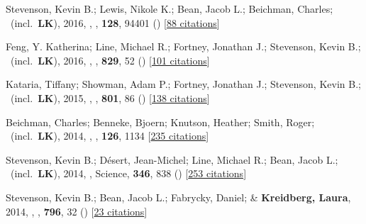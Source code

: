 \item[{\color{numcolor}\scriptsize9}] Stevenson, Kevin B.; Lewis, Nikole K.; Bean, Jacob L.; Beichman, Charles; \etal\ (incl.\ \textbf{LK}), 2016, , \pasp, \textbf{128}, 94401 () [\href{https://ui.adsabs.harvard.edu/abs/2016PASP..128i4401S}{88 citations}]

\item[{\color{numcolor}\scriptsize8}] Feng, Y. Katherina; Line, Michael R.; Fortney, Jonathan J.; Stevenson, Kevin B.; \etal\ (incl.\ \textbf{LK}), 2016, , \apj, \textbf{829}, 52 () [\href{https://ui.adsabs.harvard.edu/abs/2016ApJ...829...52F}{101 citations}]

\item[{\color{numcolor}\scriptsize7}] Kataria, Tiffany; Showman, Adam P.; Fortney, Jonathan J.; Stevenson, Kevin B.; \etal\ (incl.\ \textbf{LK}), 2015, , \apj, \textbf{801}, 86 () [\href{https://ui.adsabs.harvard.edu/abs/2015ApJ...801...86K}{138 citations}]

\item[{\color{numcolor}\scriptsize6}] Beichman, Charles; Benneke, Bjoern; Knutson, Heather; Smith, Roger; \etal\ (incl.\ \textbf{LK}), 2014, , \pasp, \textbf{126}, 1134 [\href{https://ui.adsabs.harvard.edu/abs/2014PASP..126.1134B}{235 citations}]

\item[{\color{numcolor}\scriptsize5}] Stevenson, Kevin B.; D{\'e}sert, Jean-Michel; Line, Michael R.; Bean, Jacob L.; \etal\ (incl.\ \textbf{LK}), 2014, , Science, \textbf{346}, 838 () [\href{https://ui.adsabs.harvard.edu/abs/2014Sci...346..838S}{253 citations}]

\item[{\color{numcolor}\scriptsize4}] Stevenson, Kevin B.; Bean, Jacob L.; Fabrycky, Daniel; \& \textbf{Kreidberg, Laura}, 2014, , \apj, \textbf{796}, 32 () [\href{https://ui.adsabs.harvard.edu/abs/2014ApJ...796...32S}{23 citations}]

